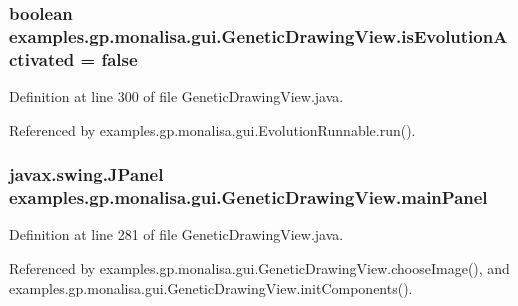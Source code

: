 \hypertarget{classexamples_1_1gp_1_1monalisa_1_1gui_1_1_genetic_drawing_view_ae0317d758eb71db9e1758874790519fb}{
\subsubsection[{is\-Evolution\-Activated}]{\setlength{\rightskip}{0pt plus 5cm}boolean examples.\-gp.\-monalisa.\-gui.\-Genetic\-Drawing\-View.\-is\-Evolution\-Activated = false\hspace{0.3cm}{\ttfamily [private]}}}\label{classexamples_1_1gp_1_1monalisa_1_1gui_1_1_genetic_drawing_view_ae0317d758eb71db9e1758874790519fb}


Definition at line 300 of file Genetic\-Drawing\-View.\-java.



Referenced by examples.\-gp.\-monalisa.\-gui.\-Evolution\-Runnable.\-run().

\hypertarget{classexamples_1_1gp_1_1monalisa_1_1gui_1_1_genetic_drawing_view_a801c8b48e27e1bffb7f6afe7cce6b869}{
\subsubsection[{main\-Panel}]{\setlength{\rightskip}{0pt plus 5cm}javax.\-swing.\-J\-Panel examples.\-gp.\-monalisa.\-gui.\-Genetic\-Drawing\-View.\-main\-Panel\hspace{0.3cm}{\ttfamily [private]}}}\label{classexamples_1_1gp_1_1monalisa_1_1gui_1_1_genetic_drawing_view_a801c8b48e27e1bffb7f6afe7cce6b869}


Definition at line 281 of file Genetic\-Drawing\-View.\-java.



Referenced by examples.\-gp.\-monalisa.\-gui.\-Genetic\-Drawing\-View.\-choose\-Image(), and examples.\-gp.\-monalisa.\-gui.\-Genetic\-Drawing\-View.\-init\-Components().

